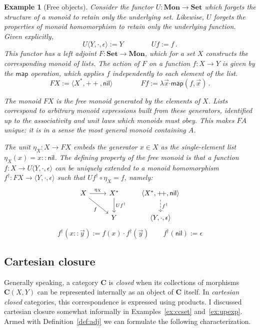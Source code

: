 \documentclass[11pt,oneside,draft]{book}
\newtheorem{example}[theorem]{Example}
\theoremstyle{definition}
\newcommand{\kw}[1]{\ensuremath{ \mathsf{#1} }}
\newcommand{\bdot}{\boldsymbol{\cdot}}
\begin{document}
\begin{example}[Free objects] %
Consider the functor $U : \mathbf{Mon} \rightarrow \mathbf{Set}$
which forgets the structure of a monoid
to retain only the underlying set.
Likewise,
$U$ forgets the properties of monoid homomorphism
to retain only the underlying function.
Given explicitly,
\[
  U \langle Y, {\cdot}, \epsilon \rangle := Y
  \qquad \qquad
  U f := f
  \,.
\]
This functor has a left adjoint
$F : \mathbf{Set} \rightarrow \mathbf{Mon}$,
which for a set $X$
constructs the corresponding monoid of lists.
The action of $F$ on a function $f : X \rightarrow Y$
is given by the $\kw{map}$ operation,
which applies $f$ independently
to each element of the list.
\[
  F X := \langle X^*, {+\!+}, \kw{nil} \rangle
  \qquad \qquad
  F f := \lambda \vec{x} \bdot \kw{map}(f, \vec{x})
  \,.
\]

The monoid $F X$ is the \emph{free monoid}
generated by the elements of $X$.
Lists correspond to arbitrary monoid expressions
built from these generators,
identified up to
the associativity and unit laws
which monoids must obey.
This makes $F A$ unique:
it is in a sense the most general monoid
containing $A$.

The unit $\eta_X : X \rightarrow F X$
embeds the generator $x \in X$ as the single-element list
$\eta_X(x) = x :: \kw{nil}$.
The defining property of the free monoid is that
a function $f : X \rightarrow U \langle Y, {\cdot}, \epsilon \rangle$
can be uniquely extended to a monoid homomorphism
$f^\dagger : F X \rightarrow \langle Y, {\cdot}, \epsilon \rangle$
such that $U f^\dagger \circ \eta_X = f$,
namely:
\[
  \begin{tikzcd}
    X \ar[r, "\eta_X"] \ar[dr, "f"'] &
    X^* \ar[d, "U f^\dagger"] &
    \langle X^*, {+\!+}, \kw{nil} \rangle
      \ar[d, "f^\dagger", dashed] \\ &
    Y &
    \langle Y, {\cdot}, \epsilon \rangle
  \end{tikzcd}
\]
\[
  f^\dagger(x :: \vec{y}) := f(x) \cdot f^\dagger(\vec{y})
  \qquad
  f^\dagger(\kw{nil}) := \epsilon
\]
\end{example}


\subsection{Cartesian closure} %

Generally speaking,
a category $\mathbf{C}$ is \emph{closed} when
its collections of morphisms $\mathbf{C}(X, Y)$
can be represented internally as an object of $\mathbf{C}$ itself.
In \emph{cartesian closed} categories,
this correspondence is expressed using products.
I discussed cartesian closure somewhat informally
in Examples~\ref{ex:ccset} and~\ref{ex:upexp}.
Armed with Definition~\ref{def:adj} we can formulate
the following characterization.
\end{document}
